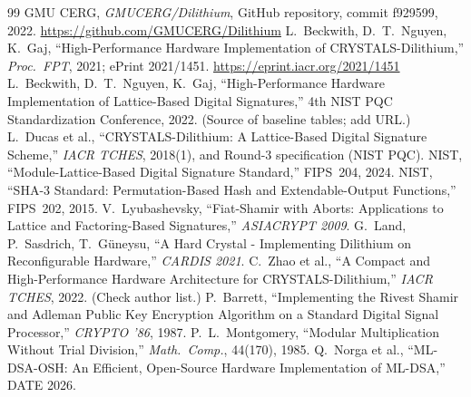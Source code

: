 \documentclass[12pt,a4paper]{report}
\begin{document}
\clearpage{}
\begingroup\singlespacing\small
\begin{thebibliography}{99}
 GMU CERG, \emph{GMUCERG/Dilithium}, GitHub repository, commit f929599, 2022. \url{https://github.com/GMUCERG/Dilithium}
 L.~Beckwith, D.~T.~Nguyen, K.~Gaj, ``High-Performance Hardware Implementation of CRYSTALS-Dilithium,'' \emph{Proc.\ FPT}, 2021; ePrint 2021/1451. \url{https://eprint.iacr.org/2021/1451}
 L.~Beckwith, D.~T.~Nguyen, K.~Gaj, ``High-Performance Hardware Implementation of Lattice-Based Digital Signatures,'' 4th NIST PQC Standardization Conference, 2022. (Source of baseline tables; add URL.)
 L.~Ducas et al., ``CRYSTALS-Dilithium: A Lattice-Based Digital Signature Scheme,'' \emph{IACR TCHES}, 2018(1), and Round-3 specification (NIST PQC).
 NIST, ``Module-Lattice-Based Digital Signature Standard,'' FIPS~204, 2024.
 NIST, ``SHA-3 Standard: Permutation-Based Hash and Extendable-Output Functions,'' FIPS~202, 2015.
 V.~Lyubashevsky, ``Fiat-Shamir with Aborts: Applications to Lattice and Factoring-Based Signatures,'' \emph{ASIACRYPT 2009}.
 G.~Land, P.~Sasdrich, T.~G\"uneysu, ``A Hard Crystal - Implementing Dilithium on Reconfigurable Hardware,'' \emph{CARDIS 2021}.
 C.~Zhao et al., ``A Compact and High-Performance Hardware Architecture for CRYSTALS-Dilithium,'' \emph{IACR TCHES}, 2022. (Check author list.)
 P.~Barrett, ``Implementing the Rivest Shamir and Adleman Public Key Encryption Algorithm on a Standard Digital Signal Processor,'' \emph{CRYPTO '86}, 1987.
 P.~L.~Montgomery, ``Modular Multiplication Without Trial Division,'' \emph{Math.\ Comp.}, 44(170), 1985.
 Q.~Norga et al., ``ML-DSA-OSH: An Efficient, Open-Source Hardware Implementation of ML-DSA,'' DATE 2026.
\end{thebibliography}
\endgroup
\end{document}
